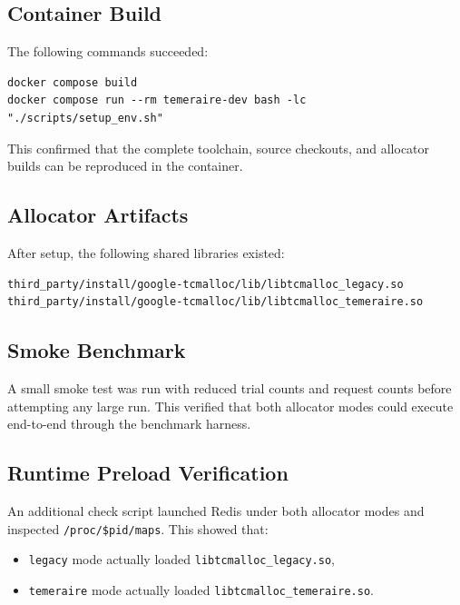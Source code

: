 \documentclass[a4paper,11pt]{article}
\begin{document}
\subsection{Container Build}

The following commands succeeded:

\begin{lstlisting}[style=codestyle]
docker compose build
docker compose run --rm temeraire-dev bash -lc "./scripts/setup_env.sh"
\end{lstlisting}

This confirmed that the complete toolchain, source checkouts, and allocator builds can be reproduced in the container.

\subsection{Allocator Artifacts}

After setup, the following shared libraries existed:

\begin{lstlisting}[style=codestyle]
third_party/install/google-tcmalloc/lib/libtcmalloc_legacy.so
third_party/install/google-tcmalloc/lib/libtcmalloc_temeraire.so
\end{lstlisting}

\subsection{Smoke Benchmark}

A small smoke test was run with reduced trial counts and request counts before attempting any large run.
This verified that both allocator modes could execute end-to-end through the benchmark harness.

\subsection{Runtime Preload Verification}

An additional check script launched Redis under both allocator modes and inspected \texttt{/proc/\$pid/maps}.
This showed that:

\begin{itemize}[leftmargin=1.5em]
  \item \texttt{legacy} mode actually loaded \texttt{libtcmalloc\_legacy.so},
  \item \texttt{temeraire} mode actually loaded \texttt{libtcmalloc\_temeraire.so}.
\end{itemize}
\end{document}
